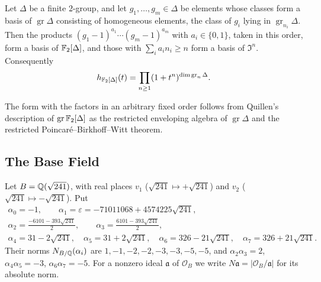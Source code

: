 \begin{theorem}\label{tw:jennings}
Let $\Delta$ be a finite $2$-group, and let $g_1,\dots,g_m\in\Delta$ be
elements whose classes form a basis of $\operatorname{gr}\Delta$ consisting of
homogeneous elements, the class of $g_i$ lying in
$\operatorname{gr}_{n_i}\Delta$. Then the products
$(g_1-1)^{a_1}\cdots(g_m-1)^{a_m}$ with $a_i\in\{0,1\}$, taken in this order,
form a basis of $\mathbb F_2[\Delta]$, and those with $\sum_ia_in_i\ge n$ form a
basis of $\mathfrak I^n$. Consequently
\[
 h_{\mathbb F_2[\Delta]}(t)=\prod_{n\ge1}(1+t^n)^{\dim\operatorname{gr}_n\Delta}.
\]
\end{theorem}
The form with the factors in an arbitrary fixed order follows from
Quillen's description of $\operatorname{gr}\mathbb F_2[\Delta]$ as the restricted
enveloping algebra of $\operatorname{gr}\Delta$ \cite{Quillen} and the
restricted Poincar\'e--Birkhoff--Witt theorem.

\subsection{The Base Field}\label{tw:base-section}
Let $B=\mathbb Q(\sqrt{241})$, with real places $v_1$ ($\sqrt{241}\mapsto+\sqrt{241}$)
and $v_2$ ($\sqrt{241}\mapsto-\sqrt{241}$). Put
\begin{equation}\label{tw:alpha}
\begin{gathered}
 \alpha_0=-1,\qquad \alpha_1=\varepsilon=-71011068+4574225\sqrt{241},\\
 \alpha_2=\tfrac{-6101-393\sqrt{241}}2,\qquad
 \alpha_3=\tfrac{6101-393\sqrt{241}}2,\\
 \alpha_4=31-2\sqrt{241},\quad \alpha_5=31+2\sqrt{241},\quad
 \alpha_6=326-21\sqrt{241},\quad \alpha_7=326+21\sqrt{241}.
\end{gathered}
\end{equation}
Their norms $N_{B/\mathbb Q}(\alpha_i)$ are $1,-1,-2,-2,-3,-3,-5,-5$, and
$\alpha_2\alpha_3=2$, $\alpha_4\alpha_5=-3$, $\alpha_6\alpha_7=-5$. For a
nonzero ideal $\mathfrak a$ of $\mathcal O_B$ we write
$N\mathfrak a=|\mathcal O_B/\mathfrak a|$ for its absolute norm.

